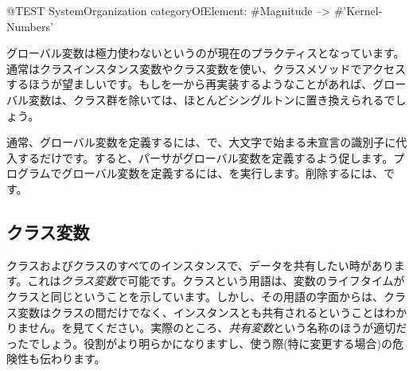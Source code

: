 \documentclass[a4paper,10pt,twoside]{book}
\begin{document}
\begin{code}{@TEST}
SystemOrganization categoryOfElement: #Magnitude --> #'Kernel-Numbers'
\end{code}

グローバル変数は極力使わないというのが現在のプラクティスとなっています。通常はクラスインスタンス変数やクラス変数を使い、クラスメソッドでアクセスするほうが望ましいです。もし\pharo を一から再実装するようなことがあれば、グローバル変数は、クラス群を除いては、ほとんどシングルトンに置き換えられるでしょう。

通常、グローバル変数を定義するには、で、大文字で始まる未宣言の識別子に代入するだけです。すると、パーサがグローバル変数を定義するよう促します。プログラムでグローバル変数を定義するには、を実行します。削除するには、です。

\subsection{クラス変数}

クラスおよびクラスのすべてのインスタンスで、データを共有したい時があります。これは\emph{クラス変数}で可能です。クラスという用語は、変数のライフタイムがクラスと同じということを示しています。しかし、その用語の字面からは、クラス変数はクラスの間だけでなく、インスタンスとも共有されるということはわかりません。を見てください。実際のところ、\emph{共有変数}という名称のほうが適切だったでしょう。役割がより明らかになりますし、使う際(特に変更する場合)の危険性も伝わります。
\end{document}
